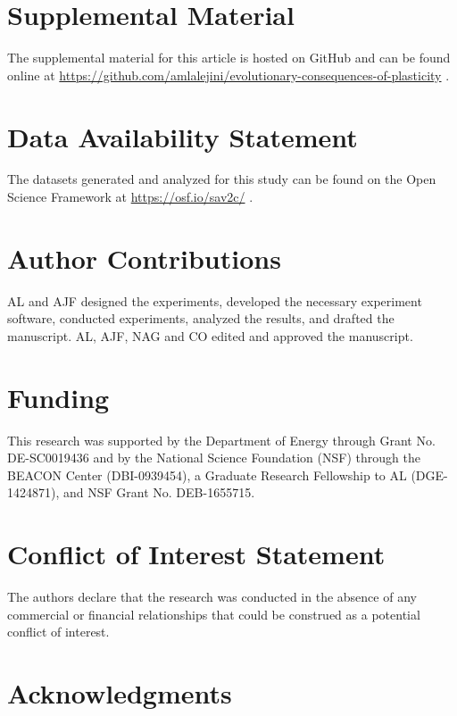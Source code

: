 \documentclass[utf8]{frontiersSCNS} %
\begin{document}
\section*{Supplemental Material}

The supplemental material for this article is hosted on GitHub and can be found online at \url{https://github.com/amlalejini/evolutionary-consequences-of-plasticity} \citep{supplemental_material}.

\section*{Data Availability Statement}

The datasets generated and analyzed for this study can be found on the Open Science Framework at \url{https://osf.io/sav2c/} \citep{osf_data}.

\section*{Author Contributions}

AL and AJF designed the experiments, developed the necessary experiment software, conducted experiments, analyzed the results, and drafted the manuscript.
AL, AJF, NAG and CO edited and approved the manuscript.

\section*{Funding}

This research was supported by the Department of Energy through Grant No. DE-SC0019436 and by the National Science Foundation (NSF) through the BEACON Center (DBI-0939454), a Graduate Research Fellowship to AL (DGE-1424871), and NSF Grant No. DEB-1655715.

\section*{Conflict of Interest Statement}

The authors declare that the research was conducted in the absence of any commercial or financial relationships that could be construed as a potential conflict of interest.

\section*{Acknowledgments}
\end{document}
